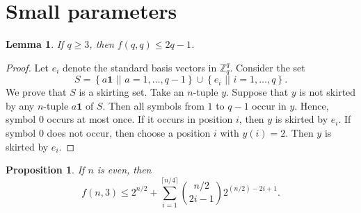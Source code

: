\documentclass[12pt,reqno]{article}
\newtheorem{lm}[thm]{Lemma}
\newtheorem{prop}[thm]{Proposition}
\newcommand{\ZZ}{\mathbb Z}
\newcommand{\one}{\mathbf 1}
\newcommand{\sett}[2]{ \left\{ #1 \, \, || \, \, #2 \right \} }
\begin{document}
\section{Small parameters}

\begin{lm}
 If $q \geq 3$, then $f(q,q) \leq 2q-1$.
\end{lm}

\begin{proof}
 Let $e_i$ denote the standard basis vectors in $\ZZ_q^q$.
 Consider the set
 \[
  S = \sett{a \one}{ a = 1, \dots, q-1} \cup \sett{e_i}{i = 1, \dots, q}.
 \]
 We prove that $S$ is a skirting set.
 Take an $n$-tuple $y$.
 Suppose that $y$ is not skirted by any $n$-tuple $a \one$ of $S$.
 Then all symbols from $1$ to $q-1$ occur in $y$.
 Hence, symbol 0 occurs at most once.
 If it occurs in position $i$, then $y$ is skirted by $e_i$.
 If symbol 0 does not occur, then choose a position $i$ with $y(i) = 2$.
 Then $y$ is skirted by $e_i$.
\end{proof}

\begin{prop}
 If $n$ is even, then
 \[
  f(n,3) \leq 2^{n/2} + \sum_{i=1}^{\lceil n/4 \rceil } \binom{n/2}{2i-1} 2^{(n/2) - 2i + 1}.
 \]
\end{prop}
\end{document}
